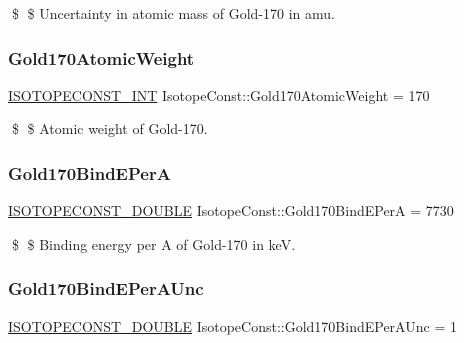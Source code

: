 \$ \$ Uncertainty in atomic mass of Gold-\/170 in amu. \mbox{\label{group___isotope_const-_gold-_au170_ga9169b1a01456084595b1396533ecfa22}} 
\subsubsection{\texorpdfstring{Gold170\+Atomic\+Weight}{Gold170AtomicWeight}}
{\footnotesize\ttfamily \mbox{\hyperlink{group___isotope_const-_macros_ga5f18360b3e99483a35c32d789e62621c}{I\+S\+O\+T\+O\+P\+E\+C\+O\+N\+S\+T\+\_\+\+I\+NT}} Isotope\+Const\+::\+Gold170\+Atomic\+Weight = 170}

\$ \$ Atomic weight of Gold-\/170. \mbox{\label{group___isotope_const-_gold-_au170_ga6f0a0a6ab4d3933b88624c08f334be7f}} 
\subsubsection{\texorpdfstring{Gold170\+Bind\+E\+PerA}{Gold170BindEPerA}}
{\footnotesize\ttfamily \mbox{\hyperlink{group___isotope_const-_macros_ga8f45a7272ce02c0b4c65c44636ed719a}{I\+S\+O\+T\+O\+P\+E\+C\+O\+N\+S\+T\+\_\+\+D\+O\+U\+B\+LE}} Isotope\+Const\+::\+Gold170\+Bind\+E\+PerA = 7730}

\$ \$ Binding energy per A of Gold-\/170 in keV. \mbox{\label{group___isotope_const-_gold-_au170_ga5dc5cf85c79453985f1ec170effe7430}} 
\subsubsection{\texorpdfstring{Gold170\+Bind\+E\+Per\+A\+Unc}{Gold170BindEPerAUnc}}
{\footnotesize\ttfamily \mbox{\hyperlink{group___isotope_const-_macros_ga8f45a7272ce02c0b4c65c44636ed719a}{I\+S\+O\+T\+O\+P\+E\+C\+O\+N\+S\+T\+\_\+\+D\+O\+U\+B\+LE}} Isotope\+Const\+::\+Gold170\+Bind\+E\+Per\+A\+Unc = 1}


